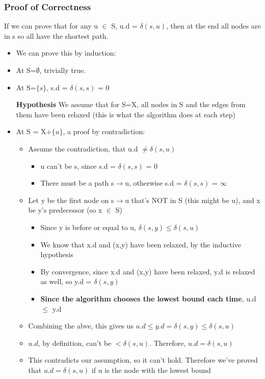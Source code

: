 \newpage
\subsubsection{Proof of Correctness}
If we can prove that for any u $\in$ S, u.d = $\delta(s,u)$, then at the end all nodes are in s so all have the shortest path.
\begin{itemize}
    \item We can prove this by induction:
    \item At S=$\emptyset$, trivially true.
    \item At S=$\{s\}$, s.d = $\delta(s,s)$ = 0
    \item [\textbf{Hypothesis}]We assume that for S=X, all nodes in S and the edges from them have been relaxed (this is what the algorithm does at each step)
    \item At S = X+$\{u\}$, a proof by contradiction:
    \begin{itemize}
        \item Assume the contradiction, that u.d $\neq \delta(s,u)$
        \begin{itemize}
            \item u can't be s, since s.d = $\delta(s,s)$ = 0
            \item There must be a path s$\rightarrow$u, otherwise s.d = $\delta(s,s)$ = $\infty$
        \end{itemize}
        \item Let y be the first node on s$\rightarrow$u that's NOT in S (this might be u), and x be y's predecessor (so x $\in$ S)
        \begin{itemize}
            \item Since y is before or equal to u, $\delta(s,y) \leq \delta(s,u)$
            \item We know that x.d and (x,y) have been relaxed, by the inductive hypothesis
            \item By convergence, since x.d and (x,y) have been relaxed, y.d is relaxed as well, so y.d = $\delta(s,y)$            
            \item \textbf{Since the algorithm chooses the lowest bound each time}, u.d $\leq$ y.d
        \end{itemize}
        \item Combining the abve, this gives us \(u.d \leq y.d = \delta(s,y) \leq \delta(s,u) \)
        \item $u.d$, by definition, can't be $< \delta(s,u)$. Therefore, $u.d = \delta(s,u)$
        \item This contradicts our assumption, so it can't hold. Therefore we've proved that $u.d = \delta(s,u)$ if u is the node with the lowest bound
    \end{itemize}
\end{itemize}

